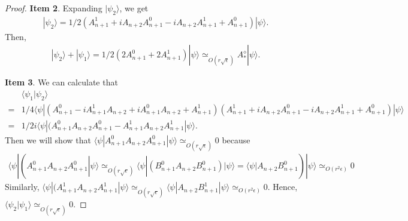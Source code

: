 \documentclass[11pt,letterpaper]{article}
\newcommand{\ket}[1]{|#1\rangle}
\newcommand{\bra}[1]{\langle#1|}
\newcommand{\braket}[2]{\langle#1|#2\rangle}
\newcommand{\1}{\mathbb{1}}
\newcommand{\ep}{\epsilon}
\newcommand{\se}{\sqrt{\epsilon}}
\newcommand{\appd}[1]{\simeq_{#1}}
\theoremstyle{definition}
\begin{document}
\begin{proof}
	\textbf{Item 2}. Expanding $\ket{\psi_2}$, we get
	\begin{align}
		\ket{\psi_2} = 1/2(A_{n+1}^1 + iA_{n+2}A_{n+1}^0 -iA_{n+2}A_{n+1}^1 + A_{n+1}^0)\ket{\psi}.
	\end{align}
	Then,
	\begin{align}
		\ket{\psi_2} + \ket{\psi_1} = 1/2( 2A_{n+1}^0 + 2A_{n+1}^1) \ket{\psi} \appd{O(r\se)} A_\ast^\diamond \ket{\psi}.
	\end{align}
	
	\textbf{Item 3}. We can calculate that 
	\begin{align*}
		&\braket{\psi_1}{\psi_2}\\
	 = &1/4\bra{\psi}(A_{n+1}^0 - iA_{n+1}^1A_{n+2} + iA_{n+1}^0A_{n+2} +A_{n+1}^1)(A_{n+1}^1 + iA_{n+2}A_{n+1}^0 -iA_{n+2}A_{n+1}^1 + A_{n+1}^0)\ket{\psi}\\
	 =& 1/2i \bra{\psi}(A_{n+1}^0A_{n+2}A_{n+1}^0-A_{n+1}^1A_{n+2}A_{n+1}^1\ket{\psi}.
	\end{align*}
	Then we will show that $\bra{\psi} A_{n+1}^0A_{n+2}A_{n+1}^0 \ket{\psi} \appd{O( r\se)} 0$ because
	\begin{align}
	 \bra{\psi}(A_{n+1}^0A_{n+2}A_{n+1}^0\ket{\psi} \appd{O(r\se)}  \bra{\psi}(B_{n+1}^0A_{n+2}B_{n+1}^0)\ket{\psi} =\bra{\psi}A_{n+2}B_{n+1}^0)\ket{\psi}
	\appd{O(r^2\ep)} 0
	\end{align}
	Similarly, $\bra{\psi}(A_{n+1}^1A_{n+2}A_{n+1}^1\ket{\psi} \appd{O(r\se)} \bra{\psi} A_{n+2}B_{n+1}^1 \ket{\psi} \appd{O(r^2\ep)} 0$.
	Hence, $\braket{\psi_2}{\psi_1} \appd{O(r\se)} 0$.
	

\end{proof}
\end{document}
